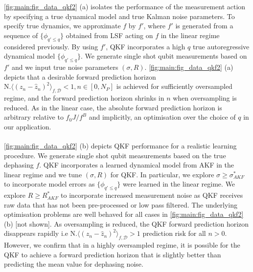 \cref{fig:main:fig_data_qkf2} (a) isolates the performance of the measurement action by specifying a true dynamical model and true Kalman noise parameters. To specify true dynamics, we approximate $f$ by $f'$, where $f'$ is generated from a sequence of $\{ \phi_{q'\leq q}\}$ obtained from LSF acting on $f$ in the linear regime considered previously. By using $f'$, QKF incorporates a high $q$ true autoregressive dynamical model $\{ \phi_{q'\leq q}\}$. We generate single shot qubit measurements based on $f'$ and we input true noise parameters $(\sigma, R)$. \cref{fig:main:fig_data_qkf2} (a) depicts that a desirable forward prediction horizon $\text{N.} \langle (z_n - \hat{z}_n)^2 \rangle_{f, \mathcal{D}} < 1, n\in [0, N_P] $ is achieved for sufficiently oversampled regime, and the forward prediction horizon shrinks in $n$ when oversampling is reduced. As in the linear case, the absolute forward prediction horizon is arbitrary relative to $f_0 J / f^B$ and implicitly, an optimisation over the choice of $q$ in our application. %
\\
\\
\cref{fig:main:fig_data_qkf2} (b) depicts QKF performance for a realistic learning procedure. We generate single shot qubit measurements based on the true dephasing $f$. QKF incorporates a learned dynamical model from AKF in the linear regime and we tune $(\sigma, R)$ for QKF. In particular, we explore $\sigma \geq \sigma_{AKF}^*$ to incorporate model errors as $\{\phi_{q' \leq q}\}$ were learned in the linear regime.  We explore $R \geq R_{AKF}^*$ to incorporate increased measurement noise as QKF receives raw data that has not been pre-processed or low pass filtered. The underlying optimisation problems are well behaved for all cases in \cref{fig:main:fig_data_qkf2}(b) [not shown]. As oversampling is reduced, the QKF forward prediction horizon disappears rapidly i.e $\text{N.} \langle (z_n - \hat{z}_n)^2 \rangle_{f, \mathcal{D}} > 1 $ prediction risk for all $n>0$.  However, we confirm that in a highly oversampled regime, it is possible for the QKF to achieve a forward prediction horizon that is slightly better than predicting the mean value for dephasing noise. 

